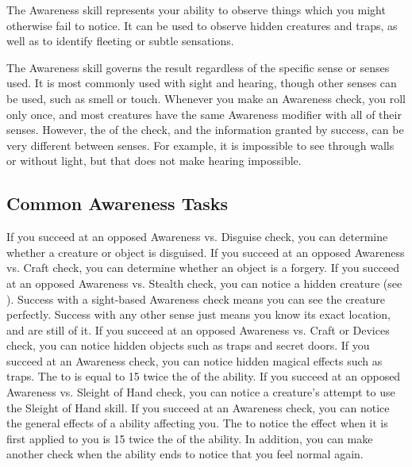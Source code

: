 \newpage
{}
    The Awareness skill represents your ability to observe things which you might otherwise fail to notice.
    It can be used to observe hidden creatures and traps, as well as to identify fleeting or subtle sensations. 

    The Awareness skill governs the result regardless of the specific sense or senses used.
    It is most commonly used with sight and hearing, though other senses can be used, such as smell or touch.
    Whenever you make an Awareness check, you roll only once, and most creatures have the same Awareness modifier with all of their senses.
    However, the  of the check, and the information granted by success, can be very different between senses.
    For example, it is impossible to see through walls or without light, but that does not make hearing impossible.

    \subsection{Common Awareness Tasks}

         If you succeed at an opposed Awareness vs. Disguise check, you can determine whether a creature or object is disguised.
         If you succeed at an opposed Awareness vs. Craft check, you can determine whether an object is a forgery.
         If you succeed at an opposed Awareness vs. Stealth check, you can notice a hidden creature (see ).
        Success with a sight-based Awareness check means you can see the creature perfectly.
        Success with any other sense just means you know its exact location, and are still \partiallyunaware of it.
         If you succeed at an opposed Awareness vs. Craft or Devices check, you can notice hidden objects such as traps and secret doors.
         If you succeed at an Awareness check, you can notice hidden magical effects such as traps.
        The  to is equal to 15 \add twice the  of the ability.
         If you succeed at an opposed Awareness vs. Sleight of Hand check, you can notice a creature's attempt to use the Sleight of Hand skill.
         If you succeed at an Awareness check, you can notice the general effects of a  ability affecting you.
        The  to notice the effect when it is first applied to you is 15 \add twice the  of the ability.
        In addition, you can make another check when the ability ends to notice that you feel normal again.

